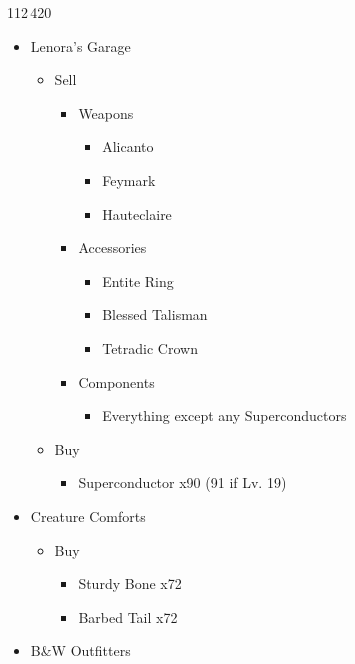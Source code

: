 \begin{shop}{112\,420}
\begin{multicols}{2}
\begin{itemize}
    \item Lenora's Garage
    \begin{itemize}
        \item Sell
        \begin{itemize}
            \item Weapons
            \begin{itemize}
                \item Alicanto
                \item Feymark
                \item Hauteclaire
            \end{itemize}
            \item Accessories
            \begin{itemize}
                \item Entite Ring
                \item Blessed Talisman
                \item Tetradic Crown
            \end{itemize}
            \item Components
            \begin{itemize}
                \item Everything except any Superconductors
            \end{itemize}
        \end{itemize}
        \item Buy
        \begin{itemize}
            \item Superconductor x90 (91 if Lv. 19)
        \end{itemize}
    \end{itemize}
    \columnbreak
    \item Creature Comforts
    \begin{itemize}
        \item Buy
        \begin{itemize}
            \item Sturdy Bone x72
            \item Barbed Tail x72
        \end{itemize}
    \end{itemize}
    \item B\&W Outfitters
    \begin{itemize}

\end{itemize}
\end{itemize}
\end{multicols}
\end{shop}
